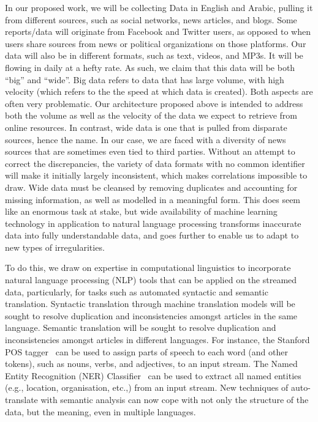 In our proposed work, we will be collecting Data in English and Arabic, pulling it from different sources, such as social networks, news articles, and blogs. Some reports/data will originate from Facebook and Twitter users, as opposed to when users share sources from news or political organizations on those platforms. Our data will also be in different formats, such as text, videos, and MP3s. It will be flowing in daily at a hefty rate. As such, we claim that this data will be both ``big'' and ``wide''. Big data refers to data that has large volume, with high velocity (which refers to the the speed at which data is created). Both aspects are often very problematic. Our architecture proposed above is intended to address both the volume as well as the velocity of the data we expect to retrieve from online resources. In contrast, wide data is one that is pulled from disparate sources, hence the name. In our case, we are faced with a diversity of news sources that are sometimes even tied to third parties. Without an attempt to correct the discrepancies, the variety of data formats with no common identifier will make it initially largely inconsistent, which makes correlations impossible to draw. Wide data must be cleansed by removing duplicates and accounting for missing information, as well as modelled in a meaningful form. This does seem like an enormous task at stake, but wide availability of machine learning technology in application to natural language processing transforms inaccurate data into fully understandable data, and goes further to enable us to adapt to new types of irregularities.

To do this, we draw on expertise in computational linguistics to incorporate natural language processing (NLP) tools that can be applied on the streamed data, particularly, for tasks such as automated syntactic and semantic translation.  Syntactic translation through machine translation models will be sought to resolve duplication and inconsistencies amongst articles in the same language. Semantic translation will be sought to resolve duplication and inconsistencies amongst articles in different languages. For instance, the Stanford POS tagger~\cite{toutanova1,toutanova2} can be used to assign parts of speech to each word (and other tokens), such as nouns, verbs, and adjectives, to an input stream. The Named Entity Recognition (NER) Classifier~\cite{FinkelGM05} can be used to extract all named entities (e.g., location, organisation, etc.,) from an input stream. New techniques of auto-translate with semantic analysis can now cope with not only the structure of the data, but the meaning, even in multiple languages.


